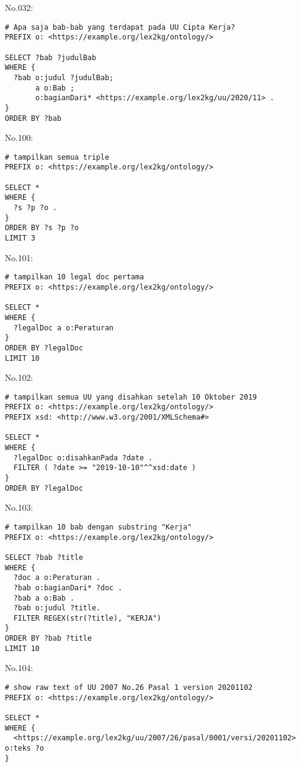 \noindent No.032:
\begin{lstlisting}
# Apa saja bab-bab yang terdapat pada UU Cipta Kerja?
PREFIX o: <https://example.org/lex2kg/ontology/>

SELECT ?bab ?judulBab
WHERE {
  ?bab o:judul ?judulBab;
       a o:Bab ;
       o:bagianDari* <https://example.org/lex2kg/uu/2020/11> .
}
ORDER BY ?bab
\end{lstlisting}


\noindent No.100:
\begin{lstlisting}
# tampilkan semua triple
PREFIX o: <https://example.org/lex2kg/ontology/>

SELECT * 
WHERE {
  ?s ?p ?o .
} 
ORDER BY ?s ?p ?o
LIMIT 3
\end{lstlisting}


\noindent No.101:
\begin{lstlisting}
# tampilkan 10 legal doc pertama
PREFIX o: <https://example.org/lex2kg/ontology/>

SELECT * 
WHERE {
  ?legalDoc a o:Peraturan
} 
ORDER BY ?legalDoc
LIMIT 10
\end{lstlisting}


\noindent No.102:
\begin{lstlisting}
# tampilkan semua UU yang disahkan setelah 10 Oktober 2019
PREFIX o: <https://example.org/lex2kg/ontology/>
PREFIX xsd: <http://www.w3.org/2001/XMLSchema#>

SELECT *
WHERE {
  ?legalDoc o:disahkanPada ?date .
  FILTER ( ?date >= "2019-10-10"^^xsd:date )
}
ORDER BY ?legalDoc

\end{lstlisting}


\noindent No.103:
\begin{lstlisting}
# tampilkan 10 bab dengan substring "Kerja"
PREFIX o: <https://example.org/lex2kg/ontology/>

SELECT ?bab ?title
WHERE {
  ?doc a o:Peraturan .
  ?bab o:bagianDari* ?doc .
  ?bab a o:Bab .
  ?bab o:judul ?title.
  FILTER REGEX(str(?title), "KERJA")
}
ORDER BY ?bab ?title
LIMIT 10

\end{lstlisting}


\noindent No.104:
\begin{lstlisting}
# show raw text of UU 2007 No.26 Pasal 1 version 20201102
PREFIX o: <https://example.org/lex2kg/ontology/>

SELECT *
WHERE {
  <https://example.org/lex2kg/uu/2007/26/pasal/0001/versi/20201102> o:teks ?o
}
\end{lstlisting}


